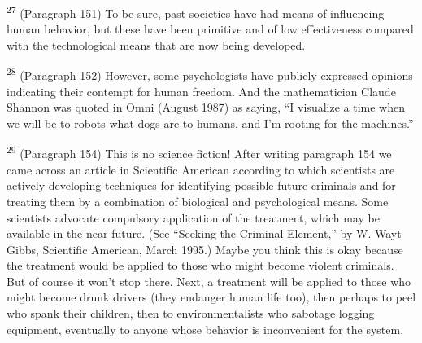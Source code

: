 \documentclass{article}
\begin{document}
\textsuperscript{27} (Paragraph 151) To be sure, past societies have had means of influencing human behavior, but 
these have been primitive and of low effectiveness compared with the technological means that 
are now being developed. \vspace{\baselineskip} \newpage

\textsuperscript{28} (Paragraph 152) However, some psychologists have publicly expressed opinions indicating 
their contempt for human freedom. And the mathematician Claude Shannon was quoted in 
Omni (August 1987) as saying, “I visualize a time when we will be to robots what dogs are to 
humans, and I’m rooting for the machines.” \vspace{\baselineskip}

\textsuperscript{29} (Paragraph 154) This is no science fiction! After writing paragraph 154 we came across an 
article in Scientific American according to which scientists are actively developing techniques 
for identifying possible future criminals and for treating them by a combination of biological and 
psychological means. Some scientists advocate compulsory application of the treatment, which 
may be available in the near future. (See “Seeking the Criminal Element,” by W. Wayt Gibbs, 
Scientific American, March 1995.) Maybe you think this is okay because the treatment would be 
applied to those who might become violent criminals. But of course it won’t stop there. Next, a 
treatment will be applied to those who might become drunk drivers (they endanger human life 
too), then perhaps to peel who spank their children, then to environmentalists who sabotage 
logging equipment, eventually to anyone whose behavior is inconvenient for the system. \vspace{\baselineskip}
\end{document}
